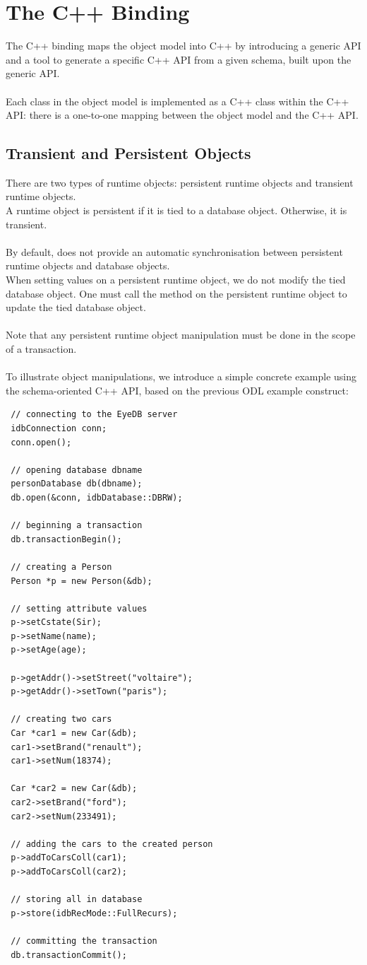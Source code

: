 \section{The C++ Binding}
The C++ binding maps the \eyedb object model into C++ by introducing
a generic API and a tool to generate a specific C++ API from
a given schema, built upon the generic API.
\\
\\
Each class in the \eyedb object model is implemented as a C++
class within the C++ API: there is a one-to-one mapping between
the object model and the C++ API.

\subsection{Transient and Persistent Objects}
There are two types of runtime objects: persistent runtime objects and
transient runtime objects.
\\
A runtime object is persistent if it is tied to a database object.
Otherwise, it is  transient.
\\
\\
By default, \eyedb does not
provide an automatic synchronisation between persistent runtime objects
and database objects.
\\
When setting values on a persistent runtime object, we do not modify
the tied database object.
One must call the  method on the persistent runtime object
to update the tied database object.
\\
\\
Note that any persistent runtime object manipulation must be done
in the scope of a transaction.
\\
\\
To illustrate object manipulations, we introduce a simple concrete
example using the schema-oriented C++ API, based on the previous ODL
example construct:
{\verbsize
\begin{verbatim}
 // connecting to the EyeDB server
 idbConnection conn;
 conn.open();

 // opening database dbname
 personDatabase db(dbname);
 db.open(&conn, idbDatabase::DBRW);

 // beginning a transaction
 db.transactionBegin();

 // creating a Person
 Person *p = new Person(&db);

 // setting attribute values
 p->setCstate(Sir);
 p->setName(name);
 p->setAge(age);

 p->getAddr()->setStreet("voltaire");
 p->getAddr()->setTown("paris");

 // creating two cars
 Car *car1 = new Car(&db);
 car1->setBrand("renault");
 car1->setNum(18374);

 Car *car2 = new Car(&db);
 car2->setBrand("ford");
 car2->setNum(233491);

 // adding the cars to the created person
 p->addToCarsColl(car1);
 p->addToCarsColl(car2);

 // storing all in database
 p->store(idbRecMode::FullRecurs);

 // committing the transaction
 db.transactionCommit();
\end{verbatim}
}
